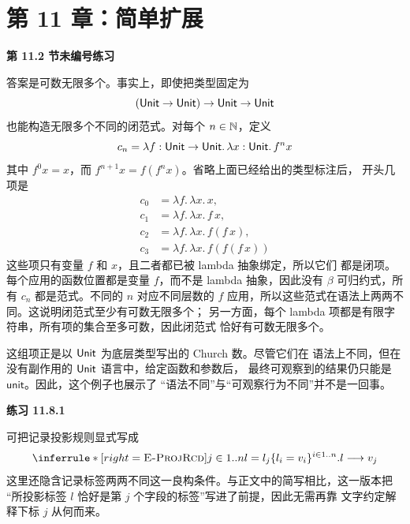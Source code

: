 \section*{第 11 章：简单扩展}

\begin{taplsolutionentrybox}
\label{sol:translator:11.2-unit-puzzle}
\textbf{第 11.2 节未编号练习}

答案是可数无限多个。事实上，即使把类型固定为
\[
(\mathsf{Unit}\to\mathsf{Unit})
\to\mathsf{Unit}\to\mathsf{Unit}
\]
也能构造无限多个不同的闭范式。对每个 \(n\in\mathbb{N}\)，定义
\[
c_n
=\lambda f:\mathsf{Unit}\to\mathsf{Unit}.\,
 \lambda x:\mathsf{Unit}.\,f^n x
\]
其中 \(f^0x=x\)，而 \(f^{n+1}x=f(f^n x)\)。省略上面已经给出的类型标注后，
开头几项是
\[
\begin{aligned}
c_0&=\lambda f.\,\lambda x.\,x,\\
c_1&=\lambda f.\,\lambda x.\,f\,x,\\
c_2&=\lambda f.\,\lambda x.\,f(f\,x),\\
c_3&=\lambda f.\,\lambda x.\,f(f(f\,x))
\end{aligned}
\]
这些项只有变量 \(f\) 和 \(x\)，且二者都已被 lambda 抽象绑定，所以它们
都是闭项。每个应用的函数位置都是变量 \(f\)，而不是 lambda 抽象，因此没有
\(\beta\) 可归约式，所有 \(c_n\) 都是范式。不同的 \(n\) 对应不同层数的
\(f\) 应用，所以这些范式在语法上两两不同。这说明闭范式至少有可数无限多个；
另一方面，每个 lambda 项都是有限字符串，所有项的集合至多可数，因此闭范式
恰好有可数无限多个。

这组项正是以 \(\mathsf{Unit}\) 为底层类型写出的 Church 数。尽管它们在
语法上不同，但在没有副作用的 \(\mathsf{Unit}\) 语言中，给定函数和参数后，
最终可观察到的结果仍只能是 \(\mathsf{unit}\)。因此，这个例子也展示了
“语法不同”与“可观察行为不同”并不是一回事。

\end{taplsolutionentrybox}

\begin{taplsolutionentrybox}
\label{sol:translator:11.8.1}
\textbf{练习 11.8.1}

可把记录投影规则显式写成
\[
\inferrule*[right=\rulename{E-ProjRcd}]
  {j\in1..n \\
   l=l_j}
  {\{l_i=v_i\}^{i\in1..n}.l\trans v_j}
\]
这里还隐含记录标签两两不同这一良构条件。与正文中的简写相比，这一版本把
“所投影标签 \(l\) 恰好是第 \(j\) 个字段的标签”写进了前提，因此无需再靠
文字约定解释下标 \(j\) 从何而来。

\end{taplsolutionentrybox}
